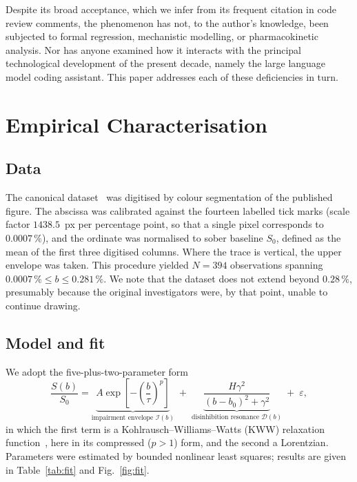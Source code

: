 \documentclass[11pt]{article}
\newcommand{\D}{\mathcal{D}}
\newcommand{\Imp}{\mathcal{I}}
\newcommand{\pct}{\,\%}
\begin{document}
Despite its broad acceptance, which we infer from its frequent citation in code review comments, the phenomenon has not, to the author's knowledge, been subjected to formal regression, mechanistic modelling, or pharmacokinetic analysis. Nor has anyone examined how it interacts with the principal technological development of the present decade, namely the large language model coding assistant. This paper addresses each of these deficiencies in turn.

\section{Empirical Characterisation}

\subsection{Data}

The canonical dataset~\citep{munroe2008} was digitised by colour segmentation of the published figure. The abscissa was calibrated against the fourteen labelled tick marks (scale factor $1438.5$~px per percentage point, so that a single pixel corresponds to $0.0007\pct$), and the ordinate was normalised to sober baseline $S_0$, defined as the mean of the first three digitised columns. Where the trace is vertical, the upper envelope was taken. This procedure yielded $N = 394$ observations spanning $0.0007\pct \le b \le 0.281\pct$. We note that the dataset does not extend beyond $0.28\pct$, presumably because the original investigators were, by that point, unable to continue drawing.

\subsection{Model and fit}

We adopt the five-plus-two-parameter form
\begin{equation}
\frac{S(b)}{S_0} = \underbrace{A \exp\!\left[-\left(\frac{b}{\tau}\right)^{p}\right]}_{\text{impairment envelope } \Imp(b)}
\;+\; \underbrace{\frac{H\gamma^{2}}{(b-b_0)^{2} + \gamma^{2}}}_{\text{disinhibition resonance } \D(b)}
\;+\; \varepsilon ,
\label{eq:model}
\end{equation}
in which the first term is a Kohlrausch--Williams--Watts (KWW) relaxation function~\citep{kohlrausch,williamswatts}, here in its compressed ($p > 1$) form, and the second a Lorentzian. Parameters were estimated by bounded nonlinear least squares; results are given in Table~\ref{tab:fit} and Fig.~\ref{fig:fit}.
\end{document}
